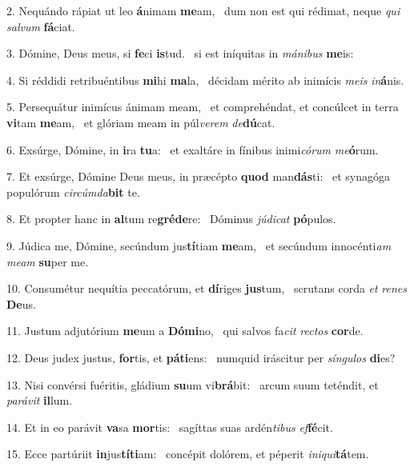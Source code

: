 2. Nequándo rápiat ut leo \textbf{á}nimam \textbf{me}am, \ast\  dum non est qui rédimat, neque \textit{qui} \textit{sal}\textit{vum} \textbf{fá}ciat.\

3. Dómine, Deus meus, si \textbf{fe}ci \textbf{is}tud. \ast\  si est iníquitas in \textit{má}\textit{ni}\textit{bus} \textbf{me}is:\

4. Si réddidi retribuéntibus \textbf{mi}hi \textbf{ma}la, \ast\  décidam mérito ab inimícis \textit{me}\textit{is} \textit{in}\textbf{á}nis.\

5. Persequátur inimícus ánimam meam, \dag\  et comprehéndat, et concúlcet in terra \textbf{vi}tam \textbf{me}am, \ast\  et glóriam meam in púl\textit{ve}\textit{rem} \textit{de}\textbf{dú}cat.\

6. Exsúrge, Dómine, in \textbf{i}ra \textbf{tu}a: \ast\  et exaltáre in fínibus inimi\textit{có}\textit{rum} \textit{me}\textbf{ó}rum.\

7. Et exsúrge, Dómine Deus meus, in præcépto \textbf{quod} man\textbf{dás}ti: \ast\  et synagóga populórum \textit{cir}\textit{cúm}\textit{da}\textbf{bit} te.\

8. Et propter hanc in \textbf{al}tum re\textbf{gré}\textbf{de}re: \ast\  Dóminus \textit{jú}\textit{di}\textit{cat} \textbf{pó}pulos.\

9. Júdica me, Dómine, secúndum jus\textbf{tí}tiam \textbf{me}am, \ast\  et secúndum innocénti\textit{am} \textit{me}\textit{am} \textbf{su}per me.\

10. Consumétur nequítia peccatórum, et \textbf{dí}riges \textbf{jus}tum, \ast\  scrutans corda \textit{et} \textit{re}\textit{nes} \textbf{De}us.\

11. Justum adjutórium \textbf{me}um a \textbf{Dó}\textbf{mi}no, \ast\  qui salvos fa\textit{cit} \textit{rec}\textit{tos} \textbf{cor}de.\

12. Deus judex justus, \textbf{for}tis, et \textbf{pá}\textbf{ti}ens: \ast\  numquid iráscitur per \textit{sín}\textit{gu}\textit{los} \textbf{di}es?\

13. Nisi convérsi fuéritis, gládium \textbf{su}um vi\textbf{brá}bit: \ast\  arcum suum teténdit, et \textit{pa}\textit{rá}\textit{vit} \textbf{il}lum.\

14. Et in eo parávit \textbf{va}sa \textbf{mor}tis: \ast\  sagíttas suas ardén\textit{ti}\textit{bus} \textit{ef}\textbf{fé}cit.\

15. Ecce partúriit \textbf{in}jus\textbf{tí}\textbf{ti}am: \ast\  concépit dolórem, et péperit \textit{in}\textit{i}\textit{qui}\textbf{tá}tem.\

